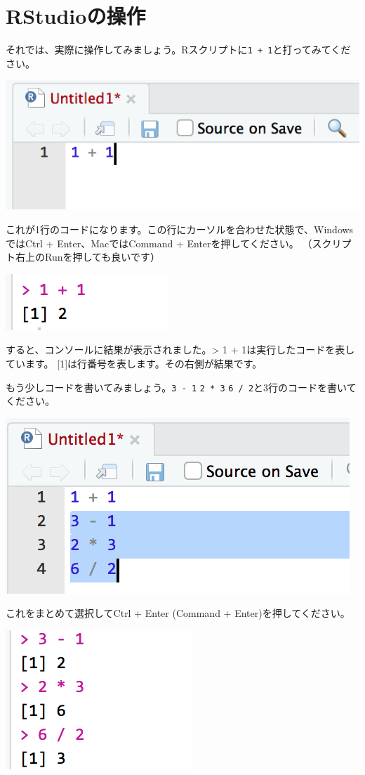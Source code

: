 \documentclass[
]{book}
\begin{document}
\hypertarget{rstudioux306eux64cdux4f5c}{%
\section{RStudioの操作}\label{rstudioux306eux64cdux4f5c}}

それでは、実際に操作してみましょう。Rスクリプトに\texttt{1\ +\ 1}と打ってみてください。

\begin{center}\includegraphics[width=0.4\linewidth]{image/basic1} \end{center}

これが1行のコードになります。この行にカーソルを合わせた状態で、WindowsではCtrl + Enter、MacではCommand + Enterを押してください。
（スクリプト右上のRunを押しても良いです）

\begin{center}\includegraphics[width=0.2\linewidth]{image/basic2} \end{center}

すると、コンソールに結果が表示されました。\textgreater{} 1 + 1は実行したコードを表しています。
{[}1{]}は行番号を表します。その右側が結果です。

もう少しコードを書いてみましょう。\texttt{3\ -\ 1} \texttt{2\ *\ 3} \texttt{6\ /\ 2}と3行のコードを書いてください。

\begin{center}\includegraphics[width=0.4\linewidth]{image/basic3} \end{center}

これをまとめて選択してCtrl + Enter (Command + Enter)を押してください。

\begin{center}\includegraphics[width=0.2\linewidth]{image/basic4} \end{center}
\end{document}
